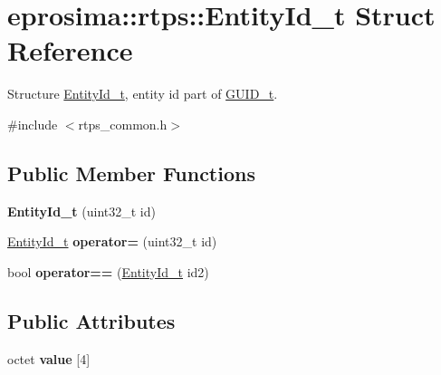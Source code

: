\hypertarget{structeprosima_1_1rtps_1_1_entity_id__t}{\section{eprosima\-:\-:rtps\-:\-:\-Entity\-Id\-\_\-t \-Struct \-Reference}
\label{structeprosima_1_1rtps_1_1_entity_id__t}
}


\-Structure \hyperlink{structeprosima_1_1rtps_1_1_entity_id__t}{\-Entity\-Id\-\_\-t}, entity id part of \hyperlink{structeprosima_1_1rtps_1_1_g_u_i_d__t}{\-G\-U\-I\-D\-\_\-t}.  




{\ttfamily \#include $<$rtps\-\_\-common.\-h$>$}

\subsection*{\-Public \-Member \-Functions}
\begin{DoxyCompactItemize}
\item 
\hypertarget{structeprosima_1_1rtps_1_1_entity_id__t_a05e67370aedb7e6f58ebbe92ea4dca71}{{\bfseries \-Entity\-Id\-\_\-t} (uint32\-\_\-t id)}\label{structeprosima_1_1rtps_1_1_entity_id__t_a05e67370aedb7e6f58ebbe92ea4dca71}

\item 
\hypertarget{structeprosima_1_1rtps_1_1_entity_id__t_af38b9c0e0a71e28c76f3e9af1b541c0c}{\hyperlink{structeprosima_1_1rtps_1_1_entity_id__t}{\-Entity\-Id\-\_\-t} {\bfseries operator=} (uint32\-\_\-t id)}\label{structeprosima_1_1rtps_1_1_entity_id__t_af38b9c0e0a71e28c76f3e9af1b541c0c}

\item 
\hypertarget{structeprosima_1_1rtps_1_1_entity_id__t_a93ab3aeec80bdbea053844c9308eedb7}{bool {\bfseries operator==} (\hyperlink{structeprosima_1_1rtps_1_1_entity_id__t}{\-Entity\-Id\-\_\-t} id2)}\label{structeprosima_1_1rtps_1_1_entity_id__t_a93ab3aeec80bdbea053844c9308eedb7}

\end{DoxyCompactItemize}
\subsection*{\-Public \-Attributes}
\begin{DoxyCompactItemize}
\item 
\hypertarget{structeprosima_1_1rtps_1_1_entity_id__t_a25b3e400314159e51bcaaef4cca39a05}{octet {\bfseries value} \mbox{[}4\mbox{]}}\label{structeprosima_1_1rtps_1_1_entity_id__t_a25b3e400314159e51bcaaef4cca39a05}

\end{DoxyCompactItemize}


